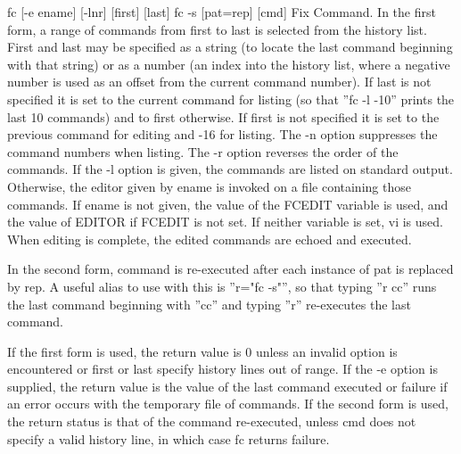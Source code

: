 fc [-e ename] [-lnr] [first] [last]
fc -s [pat=rep] [cmd]
Fix Command. In the first form, a range of commands from first to last is selected from the history list. First and last may be specified as a string (to locate the last command beginning with that string) or as a number (an index into the history list, where a negative number is used as an offset from the current command number). If last is not specified it is set to the current command for listing (so that ''fc -l -10'' prints the last 10 commands) and to first otherwise. If first is not specified it is set to the previous command for editing and -16 for listing.
The -n option suppresses the command numbers when listing. The -r option reverses the order of the commands. If the -l option is given, the commands are listed on standard output. Otherwise, the editor given by ename is invoked on a file containing those commands. If ename is not given, the value of the FCEDIT variable is used, and the value of EDITOR if FCEDIT is not set. If neither variable is set, vi is used. When editing is complete, the edited commands are echoed and executed.

In the second form, command is re-executed after each instance of pat is replaced by rep. A useful alias to use with this is ''r="fc -s"'', so that typing ''r cc'' runs the last command beginning with ''cc'' and typing ''r'' re-executes the last command.

If the first form is used, the return value is 0 unless an invalid option is encountered or first or last specify history lines out of range. If the -e option is supplied, the return value is the value of the last command executed or failure if an error occurs with the temporary file of commands. If the second form is used, the return status is that of the command re-executed, unless cmd does not specify a valid history line, in which case fc returns failure.

